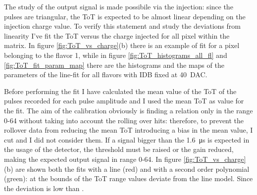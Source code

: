         The study of the output signal is made possibile via the injection: since the pulses are triangular, the ToT is expected to be almost linear depending on the injection charge value.
        To verify this statement and study the deviations from linearity I've fit the ToT versus the charge injected for all pixel within the matrix.
        In figure \ref{fig:ToT_vs_charge}(b) there is an example of fit for a pixel belonging to the flavor 1, while in figure \ref{fig:ToT_histograms_all_fl} and \ref{fig:ToT_fit_param_map} there are the histograms and the maps of the parameters of the line-fit for all flavors with IDB fixed at \SI{40}{DAC}.   

        Before performing the fit I have calculated the mean value of the ToT of the pulses recorded for each pulse amplitude and I used the mean ToT as value for the fit. 
        The aim of the calibration obviously is finding a relation only in the range 0-64 without taking into account the rolling over hits: therefore, to prevent the rollover data from reducing the mean ToT introducing a bias in the mean value, I cut and I did not consider them. 
        If a signal bigger than the \SI{1.6}{\us} is expected in the usage of the detector, the threshold must be raised or the gain reduced, making the expected output signal in range 0-64. 
        In figure \ref{fig:ToT_vs_charge} (b) are shown both the fits with a line (red) and with a second order polynomial (green): at the bounds of the ToT range values deviate from the line model. Since the deviation is low than . 

